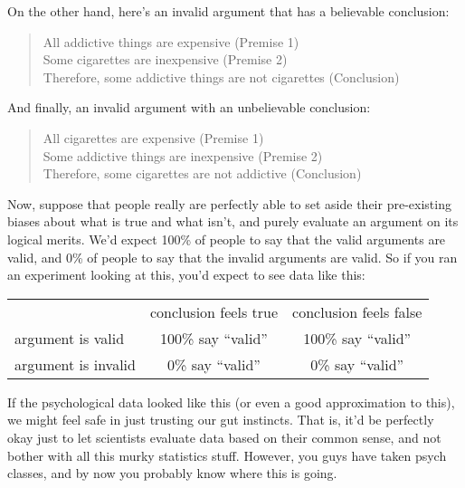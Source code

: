 On the other hand, here's an invalid argument that has a believable conclusion:
\begin{quote}
All addictive things are expensive (Premise 1)\\
Some cigarettes are inexpensive (Premise 2)\\
Therefore, some addictive things are not cigarettes (Conclusion)
\end{quote}
And finally, an invalid argument with an unbelievable conclusion:
\begin{quote}
All cigarettes are expensive (Premise 1)\\
Some addictive things are inexpensive (Premise 2)\\
Therefore, some cigarettes are not addictive (Conclusion)
\end{quote}
Now, suppose that people really are perfectly able to set aside their pre-existing biases about what is true and what isn't, and purely evaluate an argument on its logical merits. We'd expect 100\% of people to say that the valid arguments are valid, and 0\% of people to say that the invalid arguments are valid. So if you ran an experiment looking at this, you'd expect to see data like this:

\begin{center}
\renewcommand{\arraystretch}{1.5}
\begin{tabular}{l|cc|}
\multicolumn{1}{c}{} & \multicolumn{1}{c}{conclusion feels true} & \multicolumn{1}{c}{conclusion feels false} \\ \cline{2-3}
argument is valid   & 100\% say ``valid'' & 100\%  say ``valid''\\ 
argument is invalid &  0\% say ``valid''& 0\% say ``valid''\\ \cline{2-3}
\end{tabular}
\end{center}

\noindent
If the psychological data looked like this (or even a good approximation to this), we might feel safe in just trusting our gut instincts. That is, it'd be perfectly okay just to let scientists evaluate data based on their common sense, and not bother with all this murky statistics stuff. However, you guys have taken psych classes, and by now you probably know where this is going.

